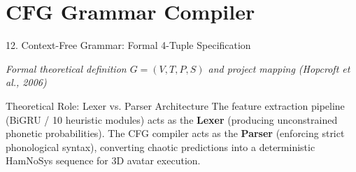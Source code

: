 \documentclass[aspectratio=169]{beamer}
\begin{document}
\section{CFG Grammar Compiler}
\begin{frame}[t]{12. Context-Free Grammar: Formal 4-Tuple Specification}
\vspace{-0.1cm}
\begin{center}
    \scriptsize\textit{\textcolor{amritaMaroon}{Formal theoretical definition $G = (V, T, P, S)$ and project mapping (Hopcroft et al., 2006)}}
\end{center}

\vspace{-1.5mm}
\begin{block}{Theoretical Role: Lexer vs. Parser Architecture}
    \fontsize{6.8pt}{8.6pt}\selectfont
    The feature extraction pipeline (BiGRU / 10 heuristic modules) acts as the \textbf{Lexer} (producing unconstrained phonetic probabilities). The CFG compiler acts as the \textbf{Parser} (enforcing strict phonological syntax), converting chaotic predictions into a deterministic HamNoSys sequence for 3D avatar execution.
\end{block}


\end{frame}
\end{document}
